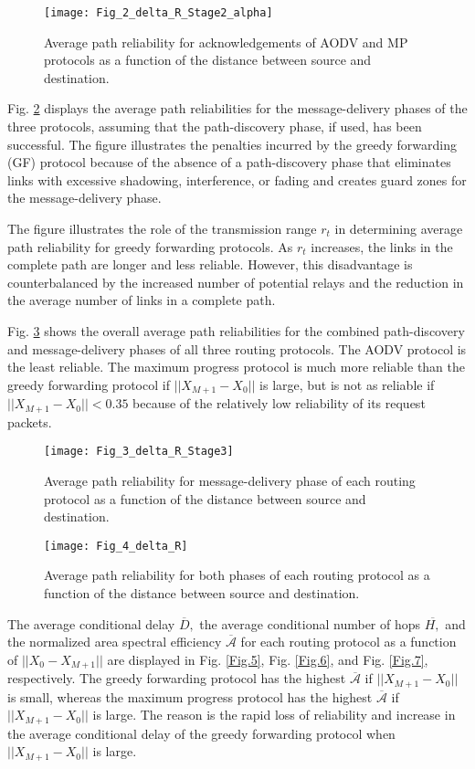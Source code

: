 \documentclass[conference]{IEEEtran}
\begin{document}
\begin{figure}[tb]\centering
\texttt{[image: Fig\_2\_delta\_R\_Stage2\_alpha]}\caption{Average path reliability for acknowledgements of AODV and MP protocols as a function of the distance between source and destination.} \label{Fig.2}
\end{figure}


Fig. \ref{Fig.3} displays the average path reliabilities for
the message-delivery phases of the three protocols, assuming that the path-discovery phase, if used, has been
successful. The figure illustrates the penalties incurred
by the greedy forwarding (GF) protocol because of
the absence of a path-discovery phase that eliminates
links with excessive shadowing, interference, or fading
and creates guard zones for the message-delivery phase.

The figure illustrates the role of the transmission range
$r_{t}$ in determining average path reliability for greedy
forwarding protocols. As $r_t$ increases, the links in the
complete path are longer and less reliable. However, this
disadvantage is counterbalanced by the increased number
of potential relays and the reduction in the average
number of links in a complete path.


Fig. \ref{Fig.4} shows the overall average path reliabilities
for the combined path-discovery and message-delivery
phases of all three routing protocols. The AODV protocol
is the least reliable. The maximum progress protocol is
much more reliable than the greedy forwarding protocol
if $||X_{M+1}-X_{0}||$
is large, but is not as reliable if $||X_{M+1}-X_{0}||<0.35$
because of the relatively low reliability of its request packets.

\begin{figure}[tb]\centering
\texttt{[image: Fig\_3\_delta\_R\_Stage3]}\caption{Average path reliability for message-delivery phase of each routing
protocol as a function of the distance between source and destination.} \label{Fig.3}
\end{figure}

\begin{figure}[tb]\centering
\texttt{[image: Fig\_4\_delta\_R]}\caption{Average path reliability for both phases of each routing protocol as a function of the distance between source and destination.} \label{Fig.4}
\end{figure}


The average conditional delay $\overline{D},$ the average conditional number
of hops $\overline{H,}$ and the normalized area spectral efficiency
$\overline{\mathcal{A}}$ for each routing protocol as a function of
$||X_{0}-X_{M+1}||$ are displayed in Fig. \ref{Fig.5}, Fig. \ref{Fig.6}, and Fig. \ref{Fig.7}, respectively. The greedy forwarding protocol
has the highest $\overline{\mathcal{A}}$ if $||X_{M+1}-X_{0}||$
is small, whereas the maximum progress protocol has the highest $\overline{\mathcal{A}}$ if $||X_{M+1}-X_{0}||$ is large. The reason is the rapid loss of reliability and increase in the average conditional delay
of the greedy forwarding protocol when
$||X_{M+1}-X_{0}||$ is large.
\end{document}
